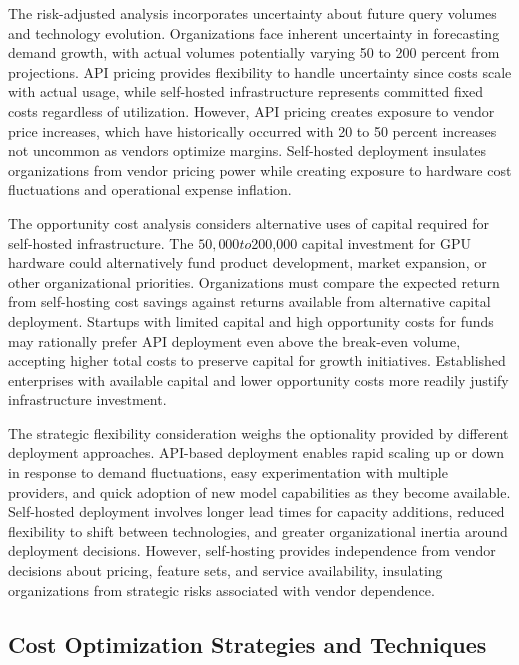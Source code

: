The risk-adjusted analysis incorporates uncertainty about future query volumes and technology evolution. Organizations face inherent uncertainty in forecasting demand growth, with actual volumes potentially varying 50 to 200 percent from projections. API pricing provides flexibility to handle uncertainty since costs scale with actual usage, while self-hosted infrastructure represents committed fixed costs regardless of utilization. However, API pricing creates exposure to vendor price increases, which have historically occurred with 20 to 50 percent increases not uncommon as vendors optimize margins. Self-hosted deployment insulates organizations from vendor pricing power while creating exposure to hardware cost fluctuations and operational expense inflation.

The opportunity cost analysis considers alternative uses of capital required for self-hosted infrastructure. The $50,000 to $200,000 capital investment for GPU hardware could alternatively fund product development, market expansion, or other organizational priorities. Organizations must compare the expected return from self-hosting cost savings against returns available from alternative capital deployment. Startups with limited capital and high opportunity costs for funds may rationally prefer API deployment even above the break-even volume, accepting higher total costs to preserve capital for growth initiatives. Established enterprises with available capital and lower opportunity costs more readily justify infrastructure investment.

The strategic flexibility consideration weighs the optionality provided by different deployment approaches. API-based deployment enables rapid scaling up or down in response to demand fluctuations, easy experimentation with multiple providers, and quick adoption of new model capabilities as they become available. Self-hosted deployment involves longer lead times for capacity additions, reduced flexibility to shift between technologies, and greater organizational inertia around deployment decisions. However, self-hosting provides independence from vendor decisions about pricing, feature sets, and service availability, insulating organizations from strategic risks associated with vendor dependence.

\subsection{Cost Optimization Strategies and Techniques}

